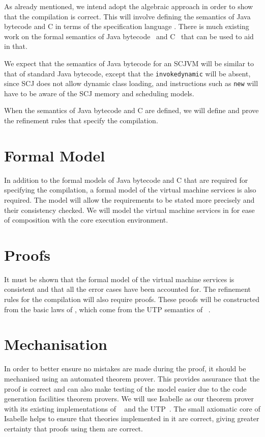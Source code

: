 \documentclass[a4paper,10pt]{report}
\begin{document}
As already mentioned, we intend adopt the algebraic approach in order to show
that the compilation is correct.  This will involve defining the semantics of
Java bytecode and C in terms of the specification language \Circus{}.  There is
much existing work on the formal semantics of Java bytecode~\cite{bertelsen2000,
  jones1998, stark2001, alves1999a, bogdanas2015, lochbihler2012a} and
C~\cite{campbell2012, ellison2012, krebbers2014} that can be used to aid in
that.

We expect that the semantics of Java bytecode for an SCJVM will be similar to
that of standard Java bytecode, except that the \texttt{invokedynamic} will be
absent, since SCJ does not allow dynamic class loading, and instructions such as
\texttt{new} will have to be aware of the SCJ memory and scheduling models.

When the semantics of Java bytecode and C are defined, we will define and prove
the refinement rules that specify the compilation.

\section{Formal Model}

In addition to the formal models of Java bytecode and C that are required for
specifying the compilation, a formal model of the virtual machine services is
also required.  The model will allow the requirements to be stated more
precisely and their consistency checked.  We will model the virtual machine
services in \Circus{} for ease of composition with the core execution
environment.

\section{Proofs}

It must be shown that the formal model of the virtual machine services is
consistent and that all the error cases have been accounted for.  The refinement
rules for the compilation will also require proofs.  These proofs will be
constructed from the basic laws of \Circus{}, which come from the UTP semantics
of \Circus{}~\cite{oliveira2009}.

\section{Mechanisation}

In order to better ensure no mistakes are made during the proof, it should be
mechanised using an automated theorem prover. This provides assurance that the
proof is correct and can also make testing of the model easier due to the code
generation facilities theorem provers.  We will use Isabelle as our theorem
prover with its existing implementations of \Circus{}~\cite{feliachi2012} and the
UTP~\cite{foster2015}.  The small axiomatic core of Isabelle helps to ensure
that theories implemented in it are correct, giving greater certainty that
proofs using them are correct.
\end{document}
